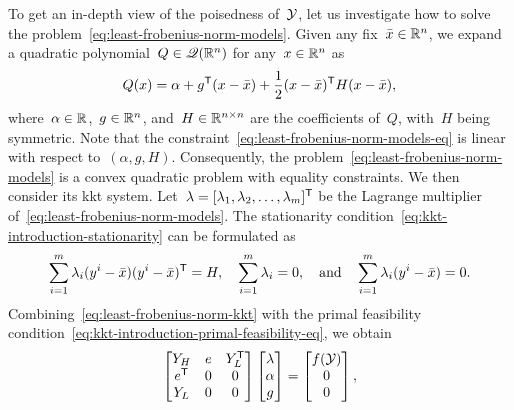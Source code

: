 To get an in-depth view of the poisedness of~$\xpt$, let us investigate how to solve the problem~\cref{eq:least-frobenius-norm-models}.
Given any fix~$\bar{x} \in \mathbb{R}^n$, we expand a quadratic polynomial~$Q \in \mathscr{Q}(\mathbb{R}^n)$ for any~$x \in \mathbb{R}^n$ as
\begin{equation*}
    Q(x) = \alpha + g^{\mathsf{T}} (x - \bar{x}) + \frac{1}{2} (x - \bar{x})^{\mathsf{T}} H(x - \bar{x}),
\end{equation*}
where~$\alpha \in \mathbb{R}$,~$g \in \mathbb{R}^n$, and~$H \in \mathbb{R}^{n \times n}$ are the coefficients of~$Q$, with~$H$ being symmetric.
Note that the constraint~\cref{eq:least-frobenius-norm-models-eq} is linear with respect to~$(\alpha, g, H)$.
Consequently, the problem~\cref{eq:least-frobenius-norm-models} is a convex quadratic problem with equality constraints.
We then consider its \gls{kkt} system.
Let~$\lambda = [\lambda_1, \lambda_2, \dots, \lambda_m]^{\mathsf{T}}$ be the Lagrange multiplier of~\cref{eq:least-frobenius-norm-models}.
The stationarity condition~\cref{eq:kkt-introduction-stationarity} can be formulated as
\begin{equation}
    \label{eq:least-frobenius-norm-kkt}
    \sum_{i = 1}^m \lambda_i (y^i - \bar{x}) (y^i - \bar{x})^{\mathsf{T}} = H, \quad \sum_{i = 1}^m \lambda_i = 0, \quad \text{and} \quad \sum_{i = 1}^m \lambda_i (y^i - \bar{x}) = 0.
\end{equation}
Combining~\cref{eq:least-frobenius-norm-kkt} with the primal feasibility condition~\cref{eq:kkt-introduction-primal-feasibility-eq}, we obtain
\begin{equation}
    \label{eq:least-frobenius-kkt-system}
    \begin{bmatrix}
        Y_H     & e & Y_L^{\T}\\
        e^{\T}  & 0 & 0\\
        Y_L     & 0 & 0
    \end{bmatrix}
    \begin{bmatrix}
        \lambda\\
        \alpha\\
        g
    \end{bmatrix}
    =
    \begin{bmatrix}
        \obj(\xpt)\\
        0\\
        0
    \end{bmatrix},
\end{equation}
